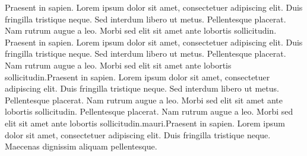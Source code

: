Praesent in sapien. Lorem ipsum dolor sit amet, consectetuer adipiscing elit. Duis fringilla tristique neque. Sed interdum libero ut metus. Pellentesque placerat. Nam rutrum augue a leo. Morbi sed elit sit amet ante lobortis sollicitudin.
Praesent in sapien. Lorem ipsum dolor sit amet, consectetuer adipiscing elit. Duis fringilla tristique neque. Sed interdum libero ut metus. Pellentesque placerat. Nam rutrum augue a leo. Morbi sed elit sit amet ante lobortis sollicitudin.Praesent in sapien. Lorem ipsum dolor sit amet, consectetuer adipiscing elit. Duis fringilla tristique neque. Sed interdum libero ut metus. Pellentesque placerat. Nam rutrum augue a leo. Morbi sed elit sit amet ante lobortis sollicitudin. Pellentesque placerat. Nam rutrum augue a leo. Morbi sed elit sit amet ante lobortis sollicitudin.mauri.Praesent in sapien. Lorem ipsum dolor sit amet, consectetuer adipiscing elit. Duis fringilla tristique neque. Maecenas dignissim aliquam pellentesque. 

